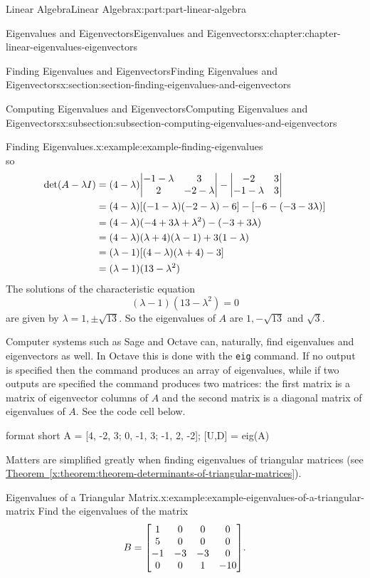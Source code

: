 \documentclass[twoside,10pt,]{book}
\newcommand{\xreffont}{\relax}
\newcommand{\mono}[1]{\texttt{#1}}
\numberwithin{equation}{part}
\begin{document}
\begin{partptx}{Linear Algebra}{}{Linear Algebra}{}{}{x:part:part-linear-algebra}
\begin{chapterptx}{Eigenvalues and Eigenvectors}{}{Eigenvalues and Eigenvectors}{}{}{x:chapter:chapter-linear-eigenvalues-eigenvectors}
\begin{sectionptx}{Finding Eigenvalues and Eigenvectors}{}{Finding Eigenvalues and Eigenvectors}{}{}{x:section:section-finding-eigenvalues-and-eigenvectors}
\begin{subsectionptx}{Computing Eigenvalues and Eigenvectors}{}{Computing Eigenvalues and Eigenvectors}{}{}{x:subsection:subsection-computing-eigenvalues-and-eigenvectors}
\begin{example}{Finding Eigenvalues.}{x:example:example-finding-eigenvalues}
\begin{equation*}
\end{equation*}
so%
\begin{align*}
\det(A-\lambda I) &= (4-\lambda)\mqty|-1-\lambda & 3 \\ 2 & -2-\lambda| - \mqty|-2 & 3 \\ -1-\lambda & 3|\\
&= (4-\lambda)\qty[(-1-\lambda)(-2-\lambda)-6] - \qty[-6-(-3-3\lambda)]\\
&= (4-\lambda)(-4+3\lambda+\lambda^{2}) - (-3+3\lambda)\\
&= (4-\lambda)(\lambda+4)(\lambda-1)+3(1-\lambda)\\
&= (\lambda-1)\qty[(4-\lambda)(\lambda+4)-3]\\
&= (\lambda-1)(13-\lambda^{2})
\end{align*}
The solutions of the characteristic equation%
\begin{equation*}
(\lambda-1)(13-\lambda^{2}) = 0
\end{equation*}
are given by \(\lambda = 1,\pm\sqrt{13}\). So the eigenvalues of \(A\) are \(1,-\sqrt{13}\) and \(\sqrt{3}\).%
\end{example}
Computer systems such as Sage and Octave can, naturally, find eigenvalues and eigenvectors as well. In Octave this is done with the \mono{eig} command. If no output is specified then the command produces an array of eigenvalues, while if two outputs are specified the command produces two matrices: the first matrix is a matrix of eigenvector columns of \(A\) and the second matrix is a diagonal matrix of eigenvalues of \(A\). See the code cell below.%
\begin{sageinput}
format short
A = [4, -2, 3; 0, -1, 3; -1, 2, -2];
[U,D] = eig(A)
\end{sageinput}
Matters are simplified greatly when finding eigenvalues of triangular matrices (see \hyperref[x:theorem:theorem-determinants-of-triangular-matrices]{Theorem~{\xreffont\ref{x:theorem:theorem-determinants-of-triangular-matrices}}}).%
\begin{example}{Eigenvalues of a Triangular Matrix.}{x:example:example-eigenvalues-of-a-triangular-matrix}%
Find the eigenvalues of the matrix%
\begin{equation*}
B = \mqty[1 & 0 & 0 & 0 \\ 5 & 0 & 0 & 0 \\ -1 & -3 & -3 & 0 \\ 0 & 0 & 1 & -10].
\end{equation*}
%
\par\smallskip%

\end{example}
\end{subsectionptx}
\end{sectionptx}
\end{chapterptx}
\end{partptx}
\end{document}
